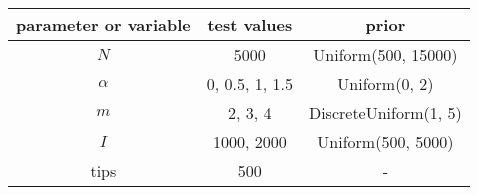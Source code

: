 \begin{tabular}{ccc}
  parameter or variable & test values & prior \\
  \hline
  $N$ & 5000 & Uniform(500, 15000) \\
  $\alpha$ & 0, 0.5, 1, 1.5 & Uniform(0, 2) \\
  $m$ & 2, 3, 4 & DiscreteUniform(1, 5) \\
  $I$ & 1000, 2000 & Uniform(500, 5000) \\
  tips & 500 & - \\
  \hline
\end{tabular}
